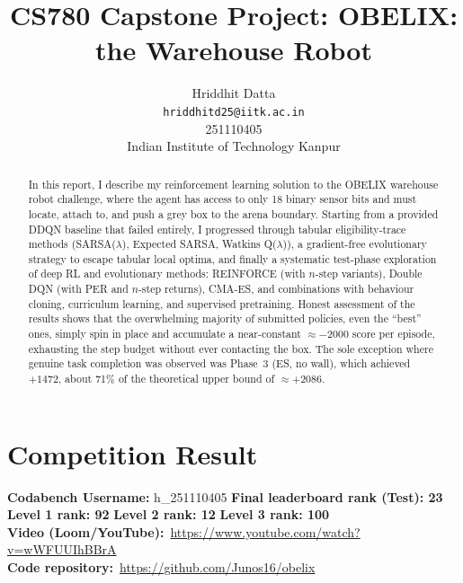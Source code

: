 \documentclass[11pt, oneside]{article}
\title{CS780 Capstone Project: OBELIX: the Warehouse Robot}
\author{
    Hriddhit Datta \\
    \texttt{hriddhitd25@iitk.ac.in}\\
    {251110405}\\
    {Indian Institute of Technology Kanpur}
}
\date{}
\begin{document}
\maketitle

\begin{abstract}
In this report, I describe my reinforcement learning solution to the OBELIX warehouse robot challenge, where the agent has access to only 18 binary sensor bits and must locate, attach to, and push a grey box to the arena boundary.
Starting from a provided DDQN baseline that failed entirely, I progressed through tabular eligibility-trace methods (SARSA($\lambda$), Expected SARSA, Watkins Q($\lambda$)), a gradient-free evolutionary strategy to escape tabular local optima, and finally a systematic test-phase exploration of deep RL and evolutionary methods: REINFORCE (with $n$-step variants), Double DQN (with PER and $n$-step returns), CMA-ES, and combinations with behaviour cloning, curriculum learning, and supervised pretraining.
Honest assessment of the results shows that the overwhelming majority of submitted policies, even the ``best'' ones, simply spin in place and accumulate a near-constant $\approx -2000$ score per episode, exhausting the step budget without ever contacting the box. The sole exception where genuine task completion was observed was Phase~3 (ES, no wall), which achieved $+1472$, about 71\% of the theoretical upper bound of $\approx +2086$.
\end{abstract}

\section{Competition Result}

\textbf{Codabench Username:} h\_251110405 \quad
\textbf{Final leaderboard rank (Test): 23} \\
\textbf{Level 1 rank: 92} \quad \textbf{Level 2 rank: 12} \quad \textbf{Level 3 rank: 100} \\[4pt]
\textbf{Video (Loom/YouTube):}~\href{https://www.youtube.com/watch?v=wWFUUIhBBrA}{https://www.youtube.com/watch?v=wWFUUIhBBrA} \\
\textbf{Code repository:}~\href{https://github.com/Junos16/obelix}{https://github.com/Junos16/obelix}
\end{document}

